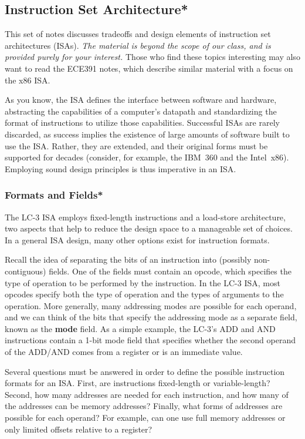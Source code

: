 \classtitle

\subsection{Instruction Set Architecture*}

This set of notes discusses 
tradeoffs and design elements of instruction set architectures (ISAs).
{\it The material is beyond the scope of our class, and is provided purely
for your interest.}  Those who find these topics interesting
may also want to read the ECE391 notes, which describe similar material
with a focus on the x86 ISA.

As you know, the ISA
defines the interface between software and hardware, abstracting the
capabilities of a computer's datapath and standardizing the format of
instructions to utilize those capabilities.  Successful ISAs are
rarely discarded, as success implies the existence of large amounts of
software built to use the ISA.  Rather, they are extended, and their
original forms must be supported for decades (consider, for example,
the IBM~360 and the Intel~x86).  Employing sound design principles
is thus imperative in an ISA.\\

\subsubsection{Formats and Fields*}

The LC-3 ISA 
employs fixed-length instructions and a load-store architecture, two
aspects that help to reduce the design space to a manageable set of
choices.  In a general ISA design, many other options exist for
instruction formats.

Recall the idea of separating the bits of an instruction into
(possibly non-contiguous) fields.  One of the fields must contain an
opcode, which specifies the type of operation to be performed by the
instruction.  In the \mbox{LC-3} ISA, most opcodes specify both
the type of operation and the types of arguments to the operation.  
More generally, many addressing modes are possible for
each operand, and we can think of the bits
that specify the addressing mode as a separate field, known as the
{\bf mode} field.  
%
As a simple example, the \mbox{LC-3's} ADD and AND instructions 
contain a \mbox{1-bit} mode field that specifies whether the second
operand of the ADD/AND comes from a register or is an immediate value.

Several questions must be answered in order to define the possible
instruction formats for an ISA.  First, are instructions fixed-length
or variable-length?  Second, how many addresses are needed for each
instruction, and how many of the addresses can be memory addresses?
Finally, what forms of addresses are possible for each operand?
For example, can one use
full memory addresses or only limited offsets relative to a register?

